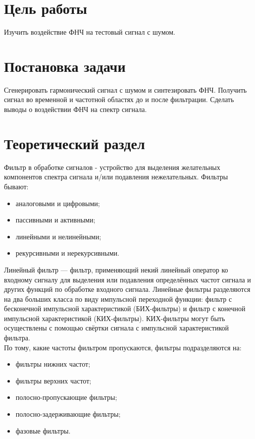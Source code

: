 \documentclass[a4paper]{article}
\begin{document}
\vfill %

\section{Цель работы}
Изучить воздействие ФНЧ на тестовый сигнал с шумом.

\section{Постановка задачи}
Сгенерировать гармонический сигнал с шумом и синтезировать ФНЧ. Получить сигнал во временной и частотной областях до и после фильтрации. Сделать выводы о воздействии ФНЧ на спектр сигнала.


\section{Теоретический раздел}
Фильтр в обработке сигналов - устройство для выделения желательных компонентов спектра сигнала и/или подавления нежелательных. Фильтры бывают:
\begin{itemize}
	\item аналоговыми и цифровыми;
	\item пассивными и активными;
	\item линейными и нелинейными;
	\item рекурсивными и нерекурсивными.
\end{itemize} 

Линейный фильтр — фильтр, применяющий некий линейный оператор ко входному сигналу для выделения или подавления определённых частот сигнала и других функций по обработке входного сигнала. Линейные фильтры разделяются на два больших класса по виду импульсной переходной функции: фильтр с бесконечной импульсной характеристикой (БИХ-фильтры) и фильтр с конечной импульсной характеристикой (КИХ-фильтры). КИХ-фильтры могут быть осуществлены с помощью свёртки сигнала с импульсной характеристикой фильтра.\\

По тому, какие частоты фильтром пропускаются, фильтры подразделяются на:
\begin{itemize}
	\item фильтры нижних частот;
	\item фильтры верхних частот;
	\item полосно-пропускающие фильтры;
	\item полосно-задерживающие фильтры;
	\item фазовые фильтры.
\end{itemize}
\end{document}
